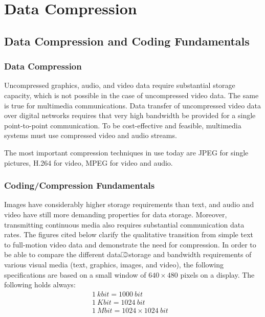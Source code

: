 \chapter{Data Compression}

\section{Data Compression and Coding Fundamentals}
\subsection{Data Compression}
Uncompressed graphics, audio, and video data require substantial storage capacity, which is not possible in the case of uncompressed video data. The same is true for multimedia communications. Data transfer of uncompressed video data over digital networks requires that very high bandwidth be provided for a single point-to-point communication. To be cost-effective and feasible, multimedia systems must use compressed video and audio streams.

The most important compression techniques in use today are JPEG for single pictures, H.264 for video, MPEG for video and audio.


\subsection{Coding/Compression Fundamentals}
Images have considerably higher storage requirements than text, and audio and video have still more demanding properties for data storage. Moreover, transmitting continuous media also requires substantial communication data rates. The figures cited below clarify the qualitative transition from simple text to full-motion video data and demonstrate the need for compression. In order to be able to compare the different data⎄storage and bandwidth requirements of various visual media (text, graphics, images, and video), the following specifications are based on a small window of $ 640 \times 480 $ pixels on a display. The following holds always:
\begin{align*}
	& 1 \:kbit = 1000 \:bit  \\
	& 1 \:Kbit = 1024 \:bit  \\ 
	& 1 \:Mbit = 1024 \times 1024 \:bit &&
\end{align*}

